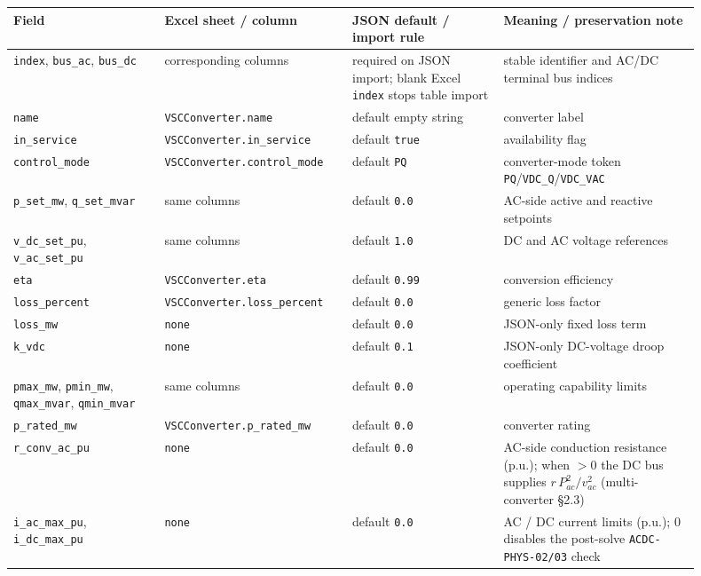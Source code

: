 \begin{longtable}{L{0.20\linewidth}L{0.24\linewidth}L{0.20\linewidth}L{0.26\linewidth}}
\toprule
Field & Excel sheet / column & JSON default / import rule & Meaning / preservation note \\
\midrule
\endhead
\texttt{index}, \texttt{bus\_ac}, \texttt{bus\_dc} & corresponding columns & required on JSON import; blank Excel \texttt{index} stops table import & stable identifier and AC/DC terminal bus indices \\
\texttt{name} & \texttt{VSCConverter.name} & default empty string & converter label \\
\texttt{in\_service} & \texttt{VSCConverter.in\_service} & default \texttt{true} & availability flag \\
\texttt{control\_mode} & \texttt{VSCConverter.control\_mode} & default \texttt{PQ} & converter-mode token \texttt{PQ}/\texttt{VDC\_Q}/\texttt{VDC\_VAC} \\
\texttt{p\_set\_mw}, \texttt{q\_set\_mvar} & same columns & default \texttt{0.0} & AC-side active and reactive setpoints \\
\texttt{v\_dc\_set\_pu}, \texttt{v\_ac\_set\_pu} & same columns & default \texttt{1.0} & DC and AC voltage references \\
\texttt{eta} & \texttt{VSCConverter.eta} & default \texttt{0.99} & conversion efficiency \\
\texttt{loss\_percent} & \texttt{VSCConverter.loss\_percent} & default \texttt{0.0} & generic loss factor \\
\texttt{loss\_mw} & \texttt{none} & default \texttt{0.0} & JSON-only fixed loss term \\
\texttt{k\_vdc} & \texttt{none} & default \texttt{0.1} & JSON-only DC-voltage droop coefficient \\
\texttt{pmax\_mw}, \texttt{pmin\_mw}, \texttt{qmax\_mvar}, \texttt{qmin\_mvar} & same columns & default \texttt{0.0} & operating capability limits \\
\texttt{p\_rated\_mw} & \texttt{VSCConverter.p\_rated\_mw} & default \texttt{0.0} & converter rating \\
\texttt{r\_conv\_ac\_pu} & \texttt{none} & default \texttt{0.0} & AC-side conduction resistance (p.u.); when \(>0\) the DC bus supplies \(r\,P_{ac}^2/v_{ac}^2\) (multi-converter \S2.3) \\
\texttt{i\_ac\_max\_pu}, \texttt{i\_dc\_max\_pu} & \texttt{none} & default \texttt{0.0} & AC / DC current limits (p.u.); \(0\) disables the post-solve \texttt{ACDC-PHYS-02/03} check \\

\end{longtable}

